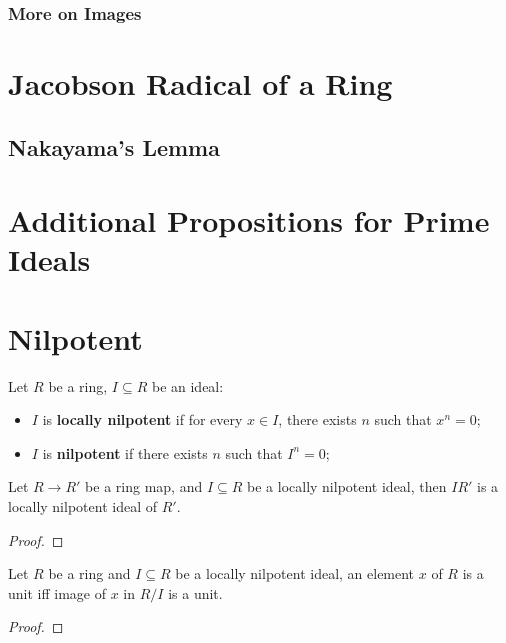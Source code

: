 \documentclass[Total.tex]{subfiles}
\begin{document}
				\subsubsection{More on Images}
				
		\section{Jacobson Radical of a Ring}
		
			\subsection{Nakayama's Lemma}
		\section{Additional Propositions for Prime Ideals}
		
		\section{Nilpotent}
		
			\begin{Def}
				Let $R$ be a ring, $I\subseteq R$ be an ideal:
				
				\begin{itemize}
					\item $I$ is \textbf{locally nilpotent} if for every $x\in I$, there exists $n$ such that $x^n=0$;
					\item $I$ is \textbf{nilpotent} if there exists $n$ such that $I^n=0$; 
				\end{itemize}
			\end{Def}
			
			\begin{lemma}
				Let $R\rightarrow R'$ be a ring map, and $I\subseteq R$ be a locally nilpotent ideal, then $IR'$ is a locally nilpotent ideal of $R'$.
			\end{lemma}
			
			\begin{proof}
			\end{proof}
			
			\begin{lemma}
				Let $R$ be a ring and $I\subseteq R$ be a locally nilpotent ideal, an element $x$ of $R$ is a unit iff image of $x$ in $R/I$ is a unit.
			\end{lemma}
			
			\begin{proof}
			\end{proof}
			
\end{document}
